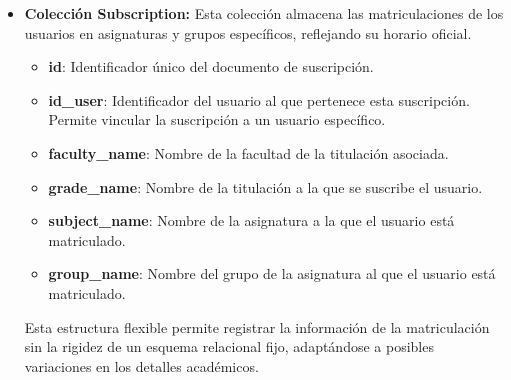 \begin{itemize}
    \item \textbf{Colección Subscription:}
    Esta colección almacena las matriculaciones de los usuarios en asignaturas y grupos específicos, reflejando su horario oficial.
    \begin{itemize}
        \item \textbf{id}: Identificador único del documento de suscripción.
        \item \textbf{id\_user}: Identificador del usuario al que pertenece esta suscripción. Permite vincular la suscripción a un usuario específico.
        \item \textbf{faculty\_name}: Nombre de la facultad de la titulación asociada.
        \item \textbf{grade\_name}: Nombre de la titulación a la que se suscribe el usuario.
        \item \textbf{subject\_name}: Nombre de la asignatura a la que el usuario está matriculado.
        \item \textbf{group\_name}: Nombre del grupo de la asignatura al que el usuario está matriculado.
    \end{itemize}
    Esta estructura flexible permite registrar la información de la matriculación sin la rigidez de un esquema relacional fijo, adaptándose a posibles variaciones en los detalles académicos.


\end{itemize}
